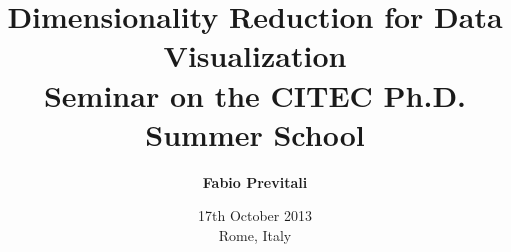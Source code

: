 \documentclass{beamer}
\title[Dimensionality Reduction for Data Visualization]{\Large Dimensionality Reduction for Data Visualization\\ \small Seminar on the CITEC Ph.D. Summer School}
\subtitle{}
\author[Fabio Previtali]{\Large\textbf{Fabio Previtali}}
\date[17th October 2013]{17th October 2013\\Rome, Italy}
\begin{document}
\begin{frame}[plain]
	\titlepage
\end{frame}





\end{document}
